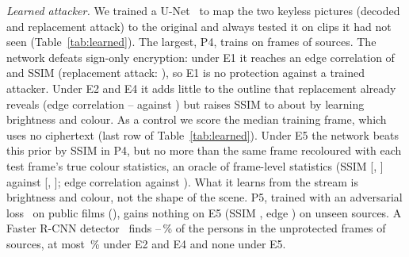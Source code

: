 \documentclass{ieeeaccess}
\newif\ifextended
\begin{document}
\ifextended\fi

\textit{Learned attacker.} We trained a U-Net~\cite{unet} to map the two keyless pictures (decoded and replacement attack) to the original and always tested it on clips it had not seen (Table~\ref{tab:learned}).\ifextended{} P1 and P2 train on \LearnTrain{} frames of one clip, P3 uses only the open films, and P4 trains a wider network for \LearnBigEpochs{} epochs on \LearnBigTrain{} frames of \LearnBigTrainSrc{} sources and tests on \LearnBigTest{} frames of \LearnBigTestSrc{} others.\else{} The largest, P4, trains on \LearnBigTrain{} frames of \LearnBigTrainSrc{} sources.\fi{} The network defeats sign-only encryption: under E1 it reaches an edge correlation of \LearnEoneEdge{} and SSIM \LearnEoneSsim{} (replacement attack: \ReplEoneEdge{}), so E1 is no protection against a trained attacker. Under E2 and E4 it adds little to the outline that replacement already reveals (edge correlation \LearnEtwoFourEdgeMin--\LearnEtwoFourEdge{} against \ReplEtwoFourEdge) but raises SSIM to about \LearnEtwoFourSsimBig{} by learning brightness and colour. As a control we score the median training frame, which uses no ciphertext (last row of Table~\ref{tab:learned}). Under E5 the network beats this prior by \LearnEfiveGain{} SSIM in P4, but no more than the same frame recoloured with each test frame's true colour statistics, an oracle of frame-level statistics (SSIM \LearnEfiveSsimBig{} [\LearnEfiveSsimLo, \LearnEfiveSsimHi] against \CtrlTrueSsim{} [\CtrlTrueLo, \CtrlTrueHi]; edge correlation \LearnEfiveEdgeBig{} against \CtrlTrueEdge). What it learns from the stream is brightness and colour, not the shape of the scene. P5, trained with an adversarial loss~\cite{isola2017} on public films (\PfiveCorpus), gains nothing on E5 (SSIM \PfiveEfiveSsim, edge \PfiveEfiveEdge) on \PfiveTestSrc{} unseen sources. A Faster R-CNN detector~\cite{ren2015} finds \RecPlainMin--\RecPlainMax\,\% of the \RecPersons{} persons in the unprotected frames of \RecSources{} sources, at most \RecEtwoFourMax\,\% under E2 and E4 and none under E5\ifextended\ (Table~\ref{tab:recognition})\fi.
\end{document}
